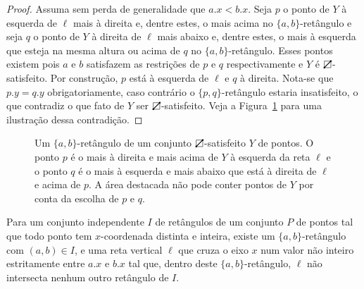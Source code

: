 \begin{proof}
    Assuma sem perda de generalidade que $a.x < b.x$.
    Seja $p$ o ponto de $Y$ à esquerda de $\ell$ mais à direita e, dentre estes, o mais acima no $\{a,b\}$-retângulo e seja $q$ o ponto de $Y$ à direita de $\ell$ mais abaixo e, dentre estes, o mais à esquerda que esteja na mesma altura ou acima de $q$ no $\{a,b\}$-retângulo. Esses pontos existem pois $a$ e $b$ satisfazem as restrições de $p$ e $q$ respectivamente e $Y$ é $\rectpos$-satisfeito. Por construção, $p$ está à esquerda de $\ell$ e $q$ à direita. Nota-se que $p.y = q.y$ obrigatoriamente, caso contrário o $\{p,q\}$-retângulo estaria insatisfeito, o que contradiz o que fato de $Y$ ser $\rectpos$-satisfeito. Veja a Figura~\ref{fig:contraexemplo_contradicao} para uma ilustração dessa contradição.
\end{proof}

\begin{figure}
    \caption{Um $\{a,b\}$-retângulo de um conjunto $\protect\rectpos$-satisfeito $Y$ de pontos. O ponto $p$ é o mais à direita e mais acima de $Y$ à esquerda da reta $\ell$ e o ponto $q$ é o mais à esquerda e mais abaixo que está à direita de $\ell$ e acima de $p$. A área destacada não pode conter pontos de $Y$ por conta da escolha de $p$ e $q$.}
\label{fig:contraexemplo_contradicao}
\end{figure}
\begin{lemma} \label{lema_6.3}
    Para um conjunto independente $I$ de retângulos de um conjunto $P$ de pontos tal que todo ponto tem $x$-coordenada distinta e inteira, existe um $\{a,b\}$-retângulo com $(a,b) \in I$, e uma reta vertical $\ell$ que cruza o eixo $x$ num valor não inteiro estritamente entre $a.x$ e $b.x$ tal que, dentro deste $\{a,b\}$-retângulo, $\ell$ não intersecta nenhum outro retângulo de $I$.
\end{lemma}

